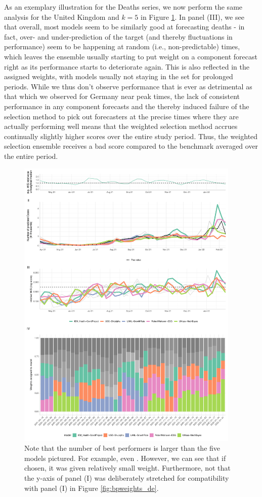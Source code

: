 As an exemplary illustration for the Deaths series, we now perform the same analysis for the United Kingdom and $k = 5$ in Figure \ref{fig:bpweights_gbdeaths}. In panel (III), we see that overall, most models seem to be similarly good at forecasting deaths - in fact, over- and under-prediction of the target (and thereby fluctuations in performance) seem to be happening at random (i.e., non-predictable) times, which leaves the ensemble usually starting to put weight on a component forecast right as its performance starts to deteriorate again. This is also reflected in the assigned weights, with models usually not staying in the set for prolonged periods. While we thus don't observe performance that is ever as detrimental as that which we observed for Germany near peak times, the lack of consistent performance in any component forecasts and the thereby induced failure of the selection method to pick out forecasters at the precise times where they are actually performing well means that the weighted selection method accrues continually slightly higher scores over the entire study period. Thus, the weighted selection ensemble receives a bad score compared to the benchmark averaged over the entire period.\\
\begin{figure}
\centering
\includegraphics[width = 0.95\textwidth]{../plots/best_performers_weights_gbdeaths}
\caption{Note that the number of best performers is larger than the five models pictured. For example, even . However, we can see that if chosen, it was given relatively small weight. Furthermore, not that the y-axis of panel (I) was deliberately stretched for compatibility with panel (I) in Figure \ref{fig:bpweights_de}. }
\label{fig:bpweights_gbdeaths}
\end{figure}
